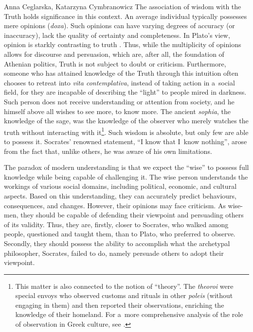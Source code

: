 \begin{artengenv2auth}{Anna Ceglarska, Katarzyna Cymbranowicz}
The association of wisdom with the Truth holds significance in this context. An average individual typically possesses mere opinions (\textit{doxa}). Such opinions can have varying degrees of accuracy (or inaccuracy), lack the quality of certainty and completeness. In Plato's view, opinion is starkly contrasting to truth 
\parencite[][pp.7–8]{arendt_promise_2005}. %
 Thus, while the multiplicity of opinions allows for discourse and persuasion, which are, after all, the foundation of Athenian politics, Truth is not subject to doubt or criticism. Furthermore, someone who has attained knowledge of the Truth through this intuition often chooses to retreat into \textit{vita contemplativa}, instead of taking action in a~social field, for they are incapable of describing the ``light'' to people mired in darkness. Such person does not receive understanding or attention from society, and he himself above all wishes to see more, to know more. The ancient \textit{sophia}, the knowledge of the sage, was the knowledge of the observer who merely watches the truth without interacting with it\footnote{This matter is also connected to the notion of ``theory''. The \textit{theoroi} were special envoys who observed customs and rituals in other \textit{poleis} (without engaging in them) and then reported their observations, enriching the knowledge of their homeland. For a~more comprehensive analysis of the role of observation in Greek culture, see 
\parencite[][]{ceglarska_od_2022}.%
}. Such wisdom is absolute, but only few are able to possess it. Socrates' renowned statement, ``I know that I~know nothing'', arose from the fact that, unlike others, he was aware of his own limitations.



The paradox of modern understanding is that we expect the ``wise'' to possess full knowledge while being capable of challenging it. The wise person understands the workings of various social domains, including political, economic, and cultural aspects. Based on this understanding, they can accurately predict behaviours, consequences, and changes. However, their opinions may face criticism. As wise-men, they should be capable of defending their viewpoint and persuading others of its validity. Thus, they are, firstly, closer to Socrates, who walked among people, questioned and taught them, than to Plato, who preferred to observe. Secondly, they should possess the ability to accomplish what the archetypal philosopher, Socrates, failed to do, namely persuade others to adopt their viewpoint.




\end{artengenv2auth}
